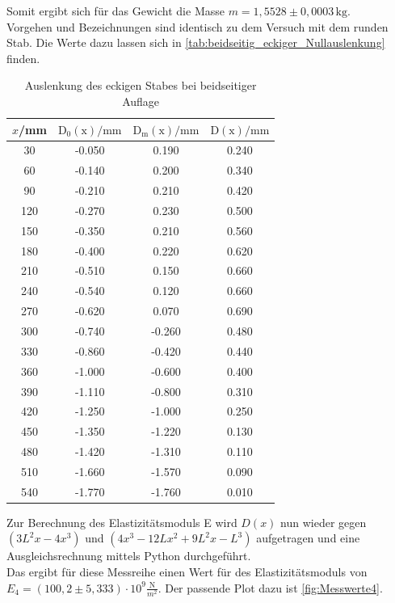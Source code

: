   Somit ergibt sich für das Gewicht die Masse $m = 1{,}5528 \pm 0,0003 \, \mathrm{kg}$.\\

  Vorgehen und Bezeichnungen sind identisch zu dem Versuch mit dem runden Stab. Die Werte dazu lassen
  sich in \autoref{tab:beidseitig_eckiger_Nullauslenkung} finden.\\

  \begin{table}
    \centering
    \caption{Auslenkung des eckigen Stabes bei beidseitiger Auflage}
    \label{tab:beidseitig_eckiger_Nullauslenkung}
    \begin{tabular}{c c c c}
      \toprule
      $x$/mm & $\mathrm{D_0(x)}/\mathrm{mm}$ & $\mathrm{D_m(x)}/\mathrm{mm}$ & $\mathrm{D(x)}/\mathrm{mm}$ \\
      \midrule
      30 & -0.050 & 0.190 & 0.240 \\
      60 & -0.140 & 0.200 & 0.340 \\
      90 & -0.210 & 0.210 & 0.420\\
      120 & -0.270 & 0.230 & 0.500\\
      150 & -0.350 & 0.210 & 0.560 \\
      180 & -0.400 & 0.220 & 0.620 \\
      210 & -0.510 & 0.150 & 0.660 \\
      240 & -0.540 & 0.120 & 0.660 \\
      270 & -0.620 & 0.070 & 0.690 \\
      300 & -0.740 & -0.260 & 0.480\\
      330 & -0.860 & -0.420 & 0.440\\
      360 & -1.000 & -0.600 & 0.400\\
      390 & -1.110 & -0.800 & 0.310\\
      420 & -1.250 & -1.000 & 0.250 \\
      450 & -1.350 & -1.220 & 0.130\\
      480 & -1.420 & -1.310 & 0.110\\
      510 & -1.660 & -1.570 & 0.090\\
      540 & -1.770 & -1.760 & 0.010\\
      \bottomrule
    \end{tabular}
  \end{table}

  Zur Berechnung des Elastizitätsmoduls E wird $D(x)$ nun wieder gegen $\left(3L^2x -4x^3\right)$ und $\left(4x^3 -12Lx^2 +9L^2 x - L^3\right)$ aufgetragen und eine Ausgleichsrechnung mittels Python durchgeführt.\\
  Das ergibt für diese Messreihe einen Wert für des Elastizitätsmoduls von $E_4 = (100{,}2 \pm 5{,}333) \cdot \mathrm{10^{9}} \frac{\mathrm{N}}{m^2}$. Der passende Plot dazu ist
  \autoref{fig:Messwerte4}.

